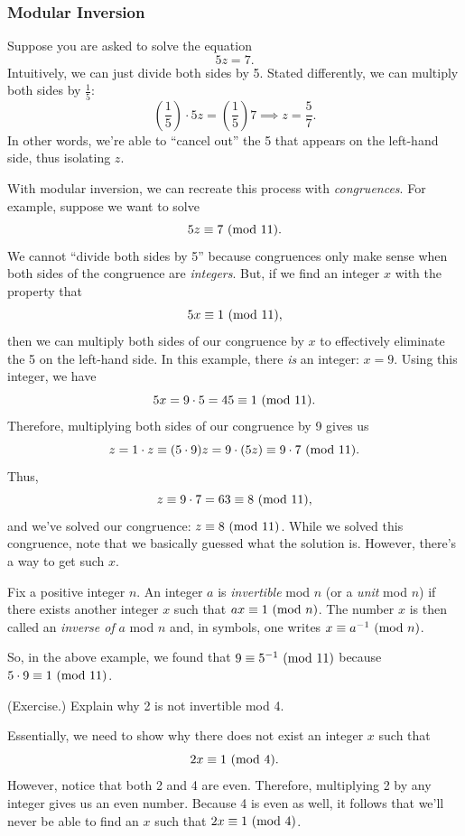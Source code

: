 \documentclass[letterpaper]{article}
\begin{document}
\subsubsection{Modular Inversion}
Suppose you are asked to solve the equation 
\[5z = 7.\]
Intuitively, we can just divide both sides by 5. Stated differently, we can multiply both sides by $\frac{1}{5}$:
\[\left(\frac{1}{5}\right) \cdot 5z = \left(\frac{1}{5}\right) 7 \implies z = \frac{5}{7}.\]
In other words, we're able to ``cancel out'' the 5 that appears on the left-hand side, thus isolating $z$. 

\bigskip 

With modular inversion, we can recreate this process with \emph{congruences}. For example, suppose we want to solve 
\[5z \equiv 7 \ (\mathrm{mod}\ 11).\]
We cannot ``divide both sides by 5'' because congruences only make sense when both sides of the congruence are \emph{integers}. But, if we find an integer $x$ with the property that 
\[5x \equiv 1 \ (\mathrm{mod}\ 11),\] 
then we can multiply both sides of our congruence by $x$ to effectively eliminate the 5 on the left-hand side. In this example, there \emph{is} an integer: $x = 9$. Using this integer, we have 
\[5x = 9 \cdot 5 = 45 \equiv 1 \ (\mathrm{mod}\ 11).\]
Therefore, multiplying both sides of our congruence by 9 gives us 
\[z = 1 \cdot z \equiv (5 \cdot 9)z = 9 \cdot (5z) \equiv 9 \cdot 7 \ (\mathrm{mod}\ 11).\]
Thus, 
\[z \equiv 9 \cdot 7 = 63 \equiv 8 \ (\mathrm{mod}\ 11),\]
and we've solved our congruence: $z \equiv 8 \ (\mathrm{mod}\ 11)$. While we solved this congruence, note that we basically guessed what the solution is. However, there's a way to get such $x$.

\begin{definition}{}{}
    Fix a positive integer $n$. An integer $a$ is \emph{invertible} mod $n$ (or a \emph{unit} mod $n$) if there exists another integer $x$ such that $ax \equiv 1 \ (\mathrm{mod}\ n)$. The number $x$ is then called an \emph{inverse of} $a$ mod $n$ and, in symbols, one writes $x \equiv a^{-1} \ (\mathrm{mod}\ n)$. 
\end{definition}
So, in the above example, we found that $9 \equiv 5^{-1} \ (\mathrm{mod}\ 11)$ because $5 \cdot 9 \equiv 1 \ (\mathrm{mod}\ 11)$. 

\begin{mdframed}
    (Exercise.) Explain why 2 is not invertible mod 4.
    \begin{mdframed}
        Essentially, we need to show why there does not exist an integer $x$ such that 
        \[2x \equiv 1 \ (\mathrm{mod}\ 4).\]
        However, notice that both 2 and 4 are even. Therefore, multiplying 2 by any integer gives us an even number. Because 4 is even as well, it follows that we'll never be able to find an $x$ such that $2x \equiv 1 \ (\mathrm{mod}\ 4)$. 
    \end{mdframed}
\end{mdframed}
\end{document}

